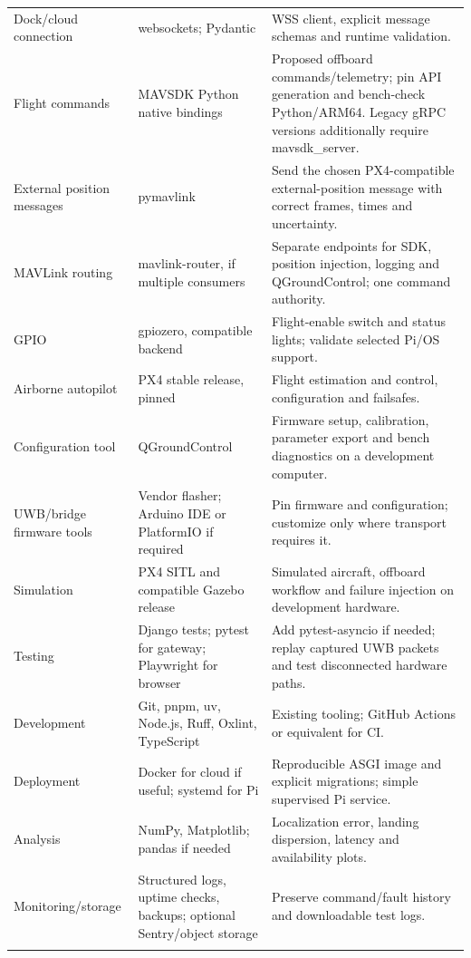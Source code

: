 \documentclass[10pt,letterpaper]{article}
\begin{document}
\begin{longtable}{P{1.329in}P{2.060in}P{3.256in}}
Dock/cloud connection & websockets; Pydantic & WSS client, explicit message schemas and runtime validation. \\ \addlinespace[2pt]
Flight commands & MAVSDK Python native bindings & Proposed offboard commands/telemetry; pin API generation and bench-check Python/ARM64. Legacy gRPC versions additionally require mavsdk\_server. \\ \addlinespace[2pt]
External position messages & pymavlink & Send the chosen PX4-compatible external-position message with correct frames, times and uncertainty. \\ \addlinespace[2pt]
MAVLink routing & mavlink-router, if multiple consumers & Separate endpoints for SDK, position injection, logging and QGroundControl; one command authority. \\ \addlinespace[2pt]
GPIO & gpiozero, compatible backend & Flight-enable switch and status lights; validate selected Pi/OS support. \\ \addlinespace[2pt]
Airborne autopilot & PX4 stable release, pinned & Flight estimation and control, configuration and failsafes. \\ \addlinespace[2pt]
Configuration tool & QGroundControl & Firmware setup, calibration, parameter export and bench diagnostics on a development computer. \\ \addlinespace[2pt]
UWB/bridge firmware tools & Vendor flasher; Arduino IDE or PlatformIO if required & Pin firmware and configuration; customize only where transport requires it. \\ \addlinespace[2pt]
Simulation & PX4 SITL and compatible Gazebo release & Simulated aircraft, offboard workflow and failure injection on development hardware. \\ \addlinespace[2pt]
Testing & Django tests; pytest for gateway; Playwright for browser & Add pytest-asyncio if needed; replay captured UWB packets and test disconnected hardware paths. \\ \addlinespace[2pt]
Development & Git, pnpm, uv, Node.js, Ruff, Oxlint, TypeScript & Existing tooling; GitHub Actions or equivalent for CI. \\ \addlinespace[2pt]
Deployment & Docker for cloud if useful; systemd for Pi & Reproducible ASGI image and explicit migrations; simple supervised Pi service. \\ \addlinespace[2pt]
Analysis & NumPy, Matplotlib; pandas if needed & Localization error, landing dispersion, latency and availability plots. \\ \addlinespace[2pt]
Monitoring/storage & Structured logs, uptime checks, backups; optional Sentry/object storage & Preserve command/fault history and downloadable test logs. \\ \addlinespace[2pt]
\end{longtable}\endgroup
\end{document}
